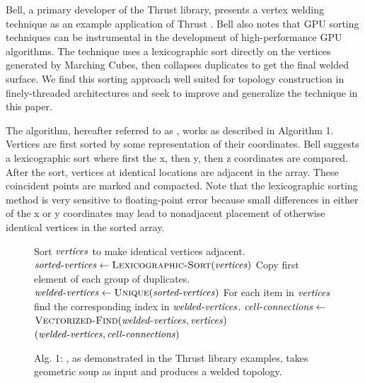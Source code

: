 \documentclass[10pt,journal,cspaper,compsoc]{IEEEtran}
\begin{document}
Bell, a primary
developer of the Thrust library, presents a vertex welding technique as an
example application of Thrust \cite{Bell2010}. Bell also notes that GPU sorting techniques can
be instrumental in the development of high-performance GPU algorithms. The technique uses a
lexicographic sort directly on the vertices generated by Marching Cubes, then collapses 
duplicates to get the final welded surface.
We find this sorting approach well suited for topology construction in
finely-threaded architectures and seek to improve and generalize the
technique in this paper.

The algorithm, hereafter referred to as , works as
described in Algorithm 1.  Vertices are first sorted by some representation
of their coordinates.  Bell suggests a lexicographic sort
where first the x, then y, then z coordinates are compared. After the sort, vertices at
identical locations are adjacent in the array.  These coincident points are
marked and compacted. Note that the lexicographic sorting method is very sensitive to
floating-point error because small differences in either of the x or y coordinates may
lead to nonadjacent placement of otherwise identical vertices in the sorted array.

\begin{figure}[h!]
\vspace{-0.3cm}
\begin{codebox}
  \zi \Comment Sort $\id{vertices}$ to make identical vertices adjacent.
  \li $\id{sorted-vertices} \gets \proc{Lexicographic-Sort}(\id{vertices})$
  \zi \Comment Copy first element of each group of duplicates.
  \li $\id{welded-vertices} \gets \proc{Unique}(\id{sorted-vertices})$
  \zi \Comment For each item in $\id{vertices}$ find the corresponding
  \zi \Comment index in $\id{welded-vertices}$.
  \li $\id{cell-connections} \gets$
  \zi \> $\proc{Vectorized-Find}(\id{welded-vertices},\id{vertices})$
  \li \Return $( \id{welded-vertices}, \id{cell-connections} )$
\end{codebox}
\vspace{-0.5cm}
\caption*{Alg. 1: , as demonstrated in the Thrust library examples, takes geometric soup as input and produces a welded topology.}
\end{figure}
\end{document}
